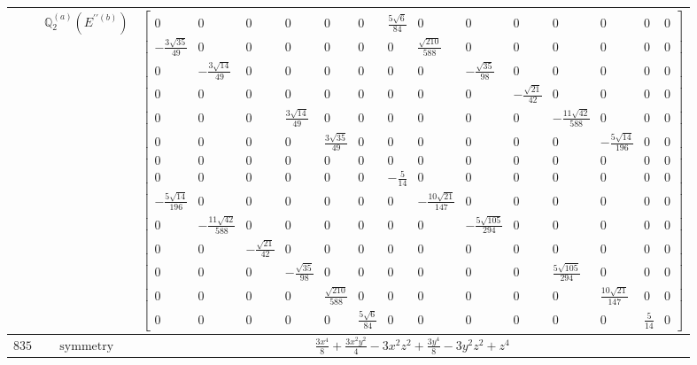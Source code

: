 \documentclass[fleqn,8pt,landscape]{jsarticle}
\begin{document}
\begin{longtable}{ccc}
$  $ & $ \mathbb{Q}_{2}^{(a)}(E^{\prime\prime(b)}) $ & $ \begin{bmatrix} 0 & 0 & 0 & 0 & 0 & 0 & \frac{5 \sqrt{6}}{84} & 0 & 0 & 0 & 0 & 0 & 0 & 0 \\ - \frac{3 \sqrt{35}}{49} & 0 & 0 & 0 & 0 & 0 & 0 & \frac{\sqrt{210}}{588} & 0 & 0 & 0 & 0 & 0 & 0 \\ 0 & - \frac{3 \sqrt{14}}{49} & 0 & 0 & 0 & 0 & 0 & 0 & - \frac{\sqrt{35}}{98} & 0 & 0 & 0 & 0 & 0 \\ 0 & 0 & 0 & 0 & 0 & 0 & 0 & 0 & 0 & - \frac{\sqrt{21}}{42} & 0 & 0 & 0 & 0 \\ 0 & 0 & 0 & \frac{3 \sqrt{14}}{49} & 0 & 0 & 0 & 0 & 0 & 0 & - \frac{11 \sqrt{42}}{588} & 0 & 0 & 0 \\ 0 & 0 & 0 & 0 & \frac{3 \sqrt{35}}{49} & 0 & 0 & 0 & 0 & 0 & 0 & - \frac{5 \sqrt{14}}{196} & 0 & 0 \\ 0 & 0 & 0 & 0 & 0 & 0 & 0 & 0 & 0 & 0 & 0 & 0 & 0 & 0 \\ 0 & 0 & 0 & 0 & 0 & 0 & - \frac{5}{14} & 0 & 0 & 0 & 0 & 0 & 0 & 0 \\ - \frac{5 \sqrt{14}}{196} & 0 & 0 & 0 & 0 & 0 & 0 & - \frac{10 \sqrt{21}}{147} & 0 & 0 & 0 & 0 & 0 & 0 \\ 0 & - \frac{11 \sqrt{42}}{588} & 0 & 0 & 0 & 0 & 0 & 0 & - \frac{5 \sqrt{105}}{294} & 0 & 0 & 0 & 0 & 0 \\ 0 & 0 & - \frac{\sqrt{21}}{42} & 0 & 0 & 0 & 0 & 0 & 0 & 0 & 0 & 0 & 0 & 0 \\ 0 & 0 & 0 & - \frac{\sqrt{35}}{98} & 0 & 0 & 0 & 0 & 0 & 0 & \frac{5 \sqrt{105}}{294} & 0 & 0 & 0 \\ 0 & 0 & 0 & 0 & \frac{\sqrt{210}}{588} & 0 & 0 & 0 & 0 & 0 & 0 & \frac{10 \sqrt{21}}{147} & 0 & 0 \\ 0 & 0 & 0 & 0 & 0 & \frac{5 \sqrt{6}}{84} & 0 & 0 & 0 & 0 & 0 & 0 & \frac{5}{14} & 0 \end{bmatrix} $ \\ \hline
$ 835 $ & $ \text{symmetry} $ & $ \frac{3 x^{4}}{8} + \frac{3 x^{2} y^{2}}{4} - 3 x^{2} z^{2} + \frac{3 y^{4}}{8} - 3 y^{2} z^{2} + z^{4} $ \\

\end{longtable}
\end{document}
